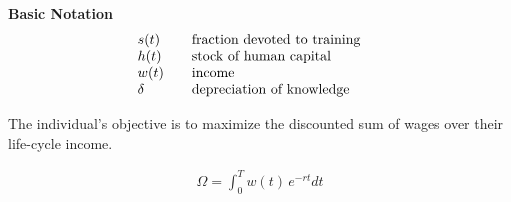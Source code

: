 \begin{frame}\textbf{Basic Notation}\vspace{0.3cm}
\begin{align*}\begin{array}{l@{\qquad}l@{\qquad}l}
s(t) 	& \text{fraction devoted to training} \\
h(t)    & \text{stock of human capital} \\
w(t)	& \text{income} \\
\delta  & \text{depreciation of knowledge}
\end{array}\end{align*}
\end{frame}
\begin{frame}
The individual's objective is to maximize the discounted sum of wages over their life-cycle income.

\begin{align*}
\Omega = \int^T_0 w(t)\, e^{-r t} dt
\end{align*}
\end{frame}

